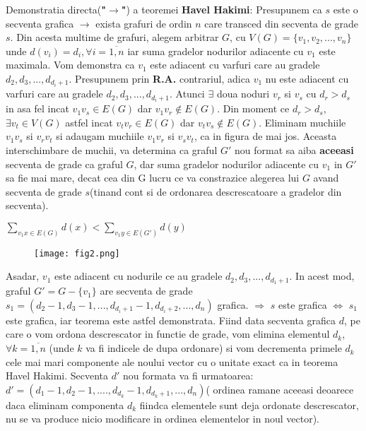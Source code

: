 \documentclass{article}
\begin{document}
\newline
\newline
Demonstratia directa(\textbf{"$\rightarrow$"}) a teoremei \textbf{Havel Hakimi}:
\newline
\newline
Presupunem ca $s$ este o secventa grafica  $\rightarrow$ exista grafuri de ordin $n$ care transced din secventa de grade $s$. Din acesta multime de grafuri, alegem arbitrar $G$, cu $V(G)=\{v_1,v_2,...,v_n\}$ unde $d(v_i)=d_i, \forall i=\overline{1,n}$ iar suma gradelor nodurilor adiacente cu $v_1$ este maximala.
\newline
\newline
Vom demonstra ca $v_1$ este adiacent cu varfuri care au gradele $d_2, d_3,..., d_{d_i+1}$. Presupunem prin \textbf{R.A.} contrariul, adica $v_1$ nu este adiacent cu varfuri care au gradele $d_2, d_3,..., d_{d_i+1}$. Atunci $\exists$ doua noduri $v_r$ si $v_s$ cu $d_r>d_s$ in asa fel incat $v_1v_s \in E(G)$ dar $v_1v_r \not \in E(G)$. Din moment ce $d_r>d_s$, $\exists v_t \in V(G)$ astfel incat $v_tv_r \in E(G)$ dar $v_tv_s \not \in E(G)$.
\newline
\newline
Eliminam muchiile $v_1v_s$ si $v_rv_t$ si adaugam muchiile $v_1v_r$ si $v_sv_t$, ca in figura de mai jos. Aceasta interschimbare de muchii, va determina ca graful $G'$ nou format sa aiba \textbf{aceeasi} secventa de grade ca graful $G$, dar suma gradelor nodurilor adiacente cu $v_1$ in $G'$ sa fie mai mare, decat cea din G lucru ce va constrazice alegerea lui $G$ avand secventa de grade $s$(tinand cont si de ordonarea descrescatoare a gradelor din secventa).
\begin{center}
$\sum_{v_1x \in E(G)} d(x)<\sum_{v_1y \in E(G')}d(y)$
\end{center} 
\begin{figure}[h]
\centering
\texttt{[image: fig2.png]}
\end{figure}
Asadar, $v_1$ este adiacent cu nodurile ce au gradele $d_2,d_3,..., d_{d_1+1}$. In acest mod, graful $G'=G-\{v_1\}$ are secventa de grade $s_1=(d_2-1,d_3-1,..., d_{d_i+1}-1, d_{d_i+2},..., d_n)$ grafica.
\newline
\newline
$\Longrightarrow$ $s$ este grafica $\Leftrightarrow$ $s_1$ este grafica, iar teorema este astfel demonstrata.
\newline
\newline
Fiind data secventa grafica $d$, pe care o vom ordona descrescator in functie de grade, vom elimina elementul $d_k$, $\forall k=\overline{1,n}$ (unde $k$ va fi indicele de dupa ordonare) si vom decrementa primele $d_k$ cele mai mari componente ale noului vector cu o unitate exact ca in teorema Havel Hakimi. Secventa $d'$ nou formata va fi urmatoarea: $d'=(d_1-1, d_2-1, ...., d_{d_k}-1, d_{d_k+1},..., d_n)$( ordinea ramane aceeasi deoarece daca eliminam componenta $d_k$ fiindca elementele sunt deja ordonate descrescator, nu se va produce nicio modificare in ordinea elementelor in noul vector).
\end{document}
